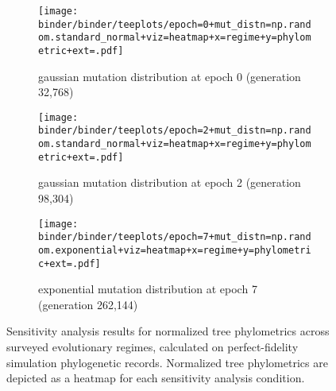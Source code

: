 \begin{figure*}
  \centering
  \begin{subfigure}[b]{\textwidth}
    \centering
    \texttt{[image: binder/binder/teeplots/epoch=0+mut\_distn=np.random.standard\_normal+viz=heatmap+x=regime+y=phylometric+ext=.pdf]}
    \caption{%
      gaussian mutation distribution at epoch 0 (generation 32,768)}
    \label{fig:perfect-tree-phylometrics-heatmap-sensitivity-analysis:epoch0}
  \end{subfigure}
  \begin{subfigure}[b]{\textwidth}
    \centering
    \texttt{[image: binder/binder/teeplots/epoch=2+mut\_distn=np.random.standard\_normal+viz=heatmap+x=regime+y=phylometric+ext=.pdf]}
    \caption{%
      gaussian mutation distribution at epoch 2 (generation 98,304)}
    \label{fig:perfect-tree-phylometrics-heatmap-sensitivity-analysis:epoch2}
  \end{subfigure}
  \begin{subfigure}[b]{\textwidth}
    \centering
    \texttt{[image: binder/binder/teeplots/epoch=7+mut\_distn=np.random.exponential+viz=heatmap+x=regime+y=phylometric+ext=.pdf]}
    \caption{%
      exponential mutation distribution at epoch 7 (generation 262,144)}
    \label{fig:perfect-tree-phylometrics-heatmap-sensitivity-analysis:exponential}
  \end{subfigure}
  \caption{%
    Sensitivity analysis results for normalized tree phylometrics across surveyed evolutionary regimes, calculated on perfect-fidelity simulation phylogenetic records.
    Normalized tree phylometrics are depicted as a heatmap for each sensitivity analysis condition.
  }
  \label{fig:perfect-tree-phylometrics-heatmap-sensitivity-analysis}
\end{figure*}
